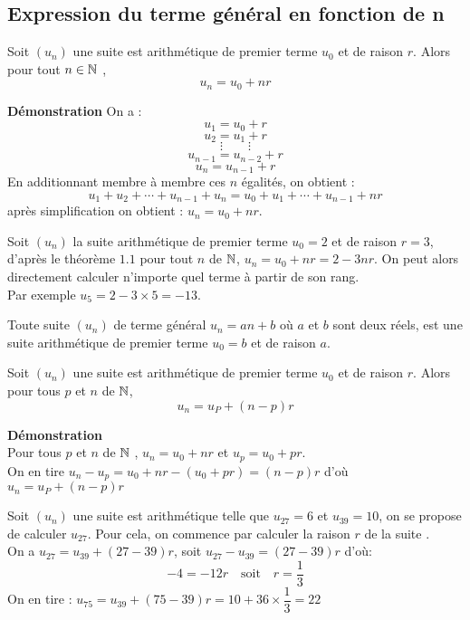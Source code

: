 \subsection*{Expression du terme général en fonction de n}
  \begin{theorem} Soit $(u_{n})$ une  suite est arithmétique  de premier terme $u_{0} $ et de raison $ r $. Alors pour tout $ n\in\mathbb{N} $  , $$ u_{n}= u_{0}+nr  $$ 
  \end{theorem}
 \textbf{Démonstration} \quad On a :  \[   u_{1}=u_{0}+r\]\[u_{2}=u_{1}+r\]\[\vdots \qquad \vdots\] \[u_{n-1}=u_{n-2}+r\]\[u_{n}=u_{n-1}+r\] En additionnant membre à membre ces $ n $ égalités, on obtient :\[u_{1}+u_{2}+ \cdots +u_{n-1}+u_{n}= u_{0}+u_{1}+ \cdots +u_{n-1}+nr\] après  simplification on obtient :  $u_{n}= u_{0}+nr $.
\begin{example}  Soit $(u_{n})$ la suite  arithmétique  de premier terme $u_{0}=2 $ et de raison $ r=3$, d'après le théorème $ 1.1 $ pour tout $n $ de $\mathbb{N} $, $ u_{n}=u_{0}+nr=2-3nr $. On peut alors directement calculer n'importe quel terme à partir de son rang.\\ Par exemple $ u_{5}=2-3\times5=-13 $.
\end{example}
\begin{remark}
Toute suite $(u_{n})$ de terme général $ u_{n}=an+b $ où $a $ et $ b $ sont deux réels, est une suite arithmétique de premier terme $u_{0}= b $ et de raison $ a $. 
\end{remark} 
 \begin{theorem}
  Soit $(u_{n})$ une  suite est arithmétique  de premier terme $u_{0} $ et de raison $ r $. Alors pour tous $ p $ et  $ n$ de $\mathbb{N} $, $$u_{n}= u_{P}+ (n-p)r  $$
  \end{theorem}
   \textbf{Démonstration}\\ Pour tous $ p $ et  $ n$ de $\mathbb{N} $  , $ u_{n}= u_{0}+ nr$ et $ u_{p}= u_{0}+ pr$.\\ On en tire $ u_{n}-u_{p}=u_{0}+ nr -(u_{0}+ pr)= (n-p)r$ d'où $ u_{n}= u_{P}+ (n-p)r $ 
\begin{example} Soit  $(u_{n})$ une  suite est arithmétique telle que  $u_{27}=6 $ et $u_{39}=10 $,  on se propose de calculer  $u_{27} $. Pour cela, on commence par calculer la raison $ r $ de la suite . \\On a $ u_{27}=u_{39}+(27-39)r $, \quad soit   $u_{27}-u_{39}=(27-39)r$ d'où: \[-4=-12r\quad \textrm{soit}\quad r=\dfrac{1}{3} \]
  On en tire : $ u_{75}=u_{39}+(75-39)r= 10+36\times\dfrac{1}{3}=22 $
  \end{example}
